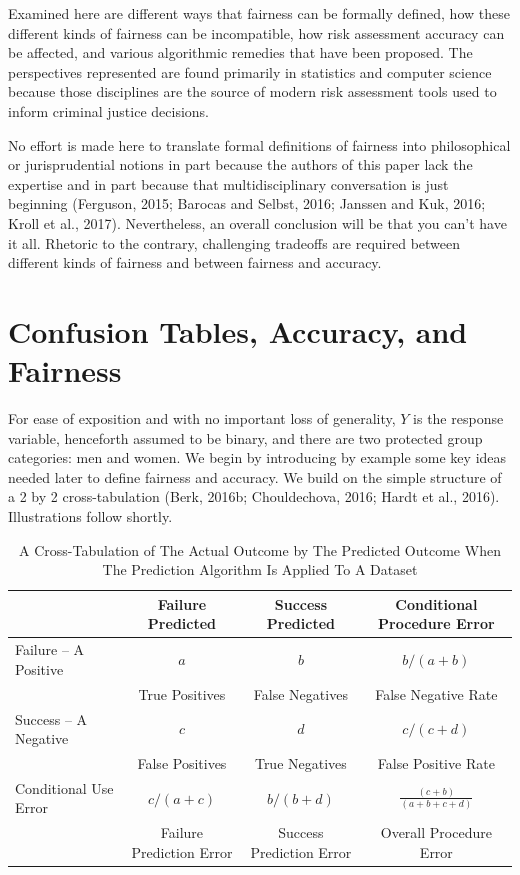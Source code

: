 \documentclass[12pt]{article}
\begin{document}
Examined here are different ways that fairness can be formally defined, how these different kinds of fairness can be incompatible, how risk assessment accuracy can be affected, and various algorithmic remedies that have been proposed. The perspectives represented are found primarily in statistics and computer science because those disciplines are the source of modern risk assessment tools used to inform criminal justice decisions. 

No effort is made here to translate formal definitions of fairness into philosophical or jurisprudential notions in part because the authors of this paper lack the expertise and in part because that multidisciplinary conversation is just beginning (Ferguson, 2015; Barocas and Selbst, 2016; Janssen and Kuk, 2016; Kroll et al., 2017). Nevertheless, an overall conclusion will be that you can't have it all. Rhetoric to the contrary, challenging tradeoffs are required between different kinds of fairness and between fairness and accuracy. 

\section{Confusion Tables, Accuracy, and Fairness}

For ease of exposition and with no important loss of generality, $Y$ is the response variable, henceforth assumed to be binary, and there are two protected group categories: men and women. We begin by introducing by example some key ideas needed later to define fairness and accuracy. We build on the simple structure of a  2 by 2 cross-tabulation (Berk, 2016b; Chouldechova, 2016; Hardt et al., 2016).  Illustrations follow shortly.

\begin{table}[htbp]
\begin{center}
\tiny
\begin{tabular}{|l|c|c|c|}
\hline 
 & Failure Predicted & Success Predicted & Conditional Procedure Error\\
\hline \hline
Failure -- A Positive   &  $a$ & $b$ & $b/(a+b)$ \\
  &   True Positives & False Negatives & False Negative Rate \\ \hline
Success -- A Negative  &  $c$ &  $d$   & $c/(c+d)$ \\
 & False Positives & True Negatives & False Positive Rate \\
\hline 
Conditional Use Error & $c/(a+c)$ & $b/(b+d)$ &  $ \frac{(c+b)}{(a+b+c+d)}$\\
  & Failure Prediction Error & Success Prediction Error & Overall Procedure Error \\
\hline
\end{tabular}
\caption{A Cross-Tabulation of The Actual Outcome by The Predicted Outcome When The Prediction Algorithm Is Applied To A Dataset}
\label{tab:xtab}
\end{center}
\end{table}
\end{document}
